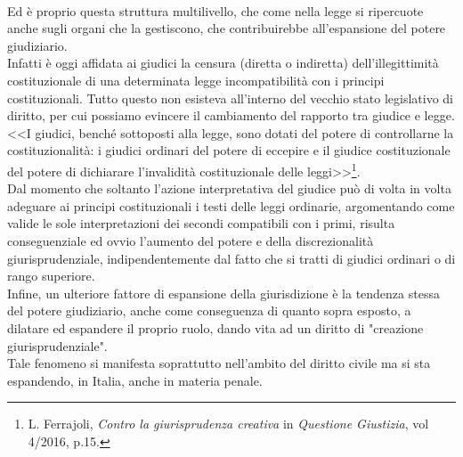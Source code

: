 \\Ed è proprio questa struttura multilivello, che come nella legge si ripercuote anche sugli organi che la gestiscono, che contribuirebbe all'espansione del potere giudiziario.
\\Infatti è oggi affidata ai giudici la censura (diretta o indiretta) dell’illegittimità costituzionale di una determinata legge incompatibilità con i principi costituzionali. Tutto questo non esisteva all'interno del vecchio stato legislativo di diritto, per cui possiamo evincere il cambiamento del rapporto tra giudice e legge. 
\\<<I giudici, benché sottoposti alla legge, sono dotati del potere di controllarne la costituzionalità: i giudici ordinari del potere di eccepire e il giudice costituzionale del potere di dichiarare l’invalidità costituzionale delle leggi>>\footnote{L. Ferrajoli, \textit{Contro la giurisprudenza creativa} in \textit{Questione Giustizia}, vol 4/2016, p.15.}. 
\\Dal momento che soltanto l'azione interpretativa del giudice può di volta in volta adeguare ai principi costituzionali i testi delle leggi ordinarie, argomentando come valide le sole interpretazioni dei secondi compatibili con i primi, risulta conseguenziale ed ovvio l'aumento del potere e della discrezionalità giurisprudenziale, indipendentemente dal fatto che si tratti di giudici ordinari o di rango superiore.
\\Infine, un ulteriore fattore di espansione della giurisdizione è la tendenza stessa del potere giudiziario, anche come conseguenza di quanto sopra esposto, a dilatare ed espandere il proprio ruolo, dando vita ad un diritto di "creazione giurisprudenziale". 
\\Tale fenomeno si manifesta soprattutto nell'ambito del diritto civile ma si sta espandendo, in Italia, anche in materia penale. 
